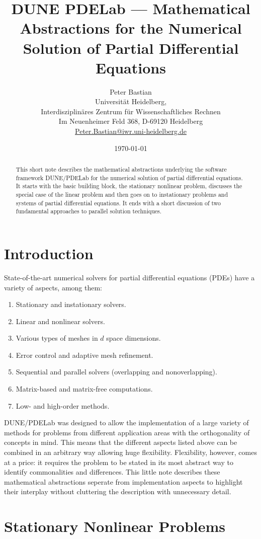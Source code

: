 \documentclass[a4paper,12pt]{article}
\title{DUNE PDELab ---
Mathematical Abstractions for the Numerical Solution of Partial Differential Equations}
\author{Peter Bastian\\
  Universität Heidelberg, \\
  Interdisziplinäres Zentrum für Wissenschaftliches Rechnen\\
  Im Neuenheimer Feld 368, D-69120 Heidelberg\\
  \url{Peter.Bastian@iwr.uni-heidelberg.de}
}
\date{\today}
\theoremstyle{definition}
\begin{document}
\maketitle

\begin{abstract}
This short note describes the mathematical abstractions underlying the
software framework DUNE/PDELab for the numerical solution of partial
differential equations. It starts with the basic building block, the
stationary nonlinear problem, discusses the special case of the linear
problem and then goes on to instationary problems and systems of partial
differential equations. It ends with a short discussion of two fundamental
approaches to parallel solution techniques.
\end{abstract}

\section{Introduction}

State-of-the-art numerical solvers for partial differential equations (PDEs)
have a variety of aspects, among them:
\begin{enumerate}[1)]
\item Stationary and instationary solvers.
\item Linear and nonlinear solvers.
\item Various types of meshes in $d$ space dimensions.
\item Error control and adaptive mesh refinement.
\item Sequential and parallel solvers (overlapping and nonoverlapping).
\item Matrix-based and matrix-free computations.
\item Low- and high-order methods.
\end{enumerate}
DUNE/PDELab was designed to allow the implementation of a large variety
of methods for problems from different application areas with the orthogonality
of concepts in mind. This means that the different aspects listed above
can be combined in an arbitrary way allowing huge flexibility.
Flexibility, however, comes at a price: it requires the problem to
be stated in its most abstract way to identify commonalities and differences. 
This little note describes
these mathematical abstractions seperate from implementation
aspects to highlight their interplay without cluttering the description
with unnecessary detail.

\section{Stationary Nonlinear Problems}\label{Sec:BasicBuildingBlock}
\end{document}
